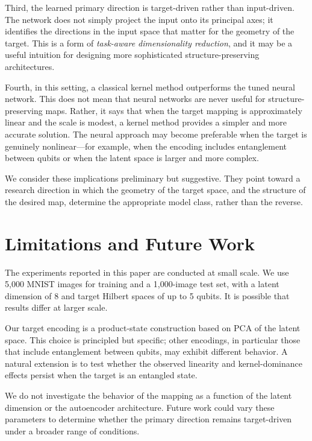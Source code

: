 \documentclass[11pt]{article}
\begin{document}
Third, the learned primary direction is target-driven rather than
input-driven. The network does not simply project the input onto its
principal axes; it identifies the directions in the input space that matter
for the geometry of the target. This is a form of \emph{task-aware
dimensionality reduction}, and it may be a useful intuition for designing
more sophisticated structure-preserving architectures.

Fourth, in this setting, a classical kernel method outperforms the tuned
neural network. This does not mean that neural networks are never useful
for structure-preserving maps. Rather, it says that when the target mapping
is approximately linear and the scale is modest, a kernel method provides
a simpler and more accurate solution. The neural approach may become
preferable when the target is genuinely nonlinear---for example, when the
encoding includes entanglement between qubits or when the latent space is
larger and more complex.

We consider these implications preliminary but suggestive. They point
toward a research direction in which the geometry of the target space, and
the structure of the desired map, determine the appropriate model class,
rather than the reverse.

\section{Limitations and Future Work}
\label{sec:limitations}

The experiments reported in this paper are conducted at small scale. We use
5{,}000 MNIST images for training and a 1{,}000-image test set, with a
latent dimension of 8 and target Hilbert spaces of up to 5 qubits. It is
possible that results differ at larger scale.

Our target encoding is a product-state construction based on PCA of the
latent space. This choice is principled but specific; other encodings, in
particular those that include entanglement between qubits, may exhibit
different behavior. A natural extension is to test whether the observed
linearity and kernel-dominance effects persist when the target is an
entangled state.

We do not investigate the behavior of the mapping as a function of the
latent dimension or the autoencoder architecture. Future work could vary
these parameters to determine whether the primary direction remains
target-driven under a broader range of conditions.
\end{document}
